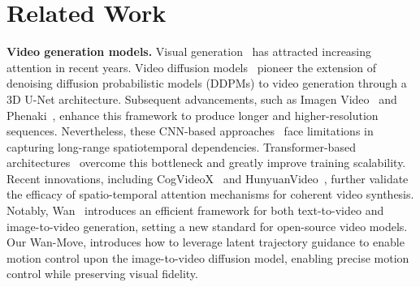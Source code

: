 \documentclass{article}
\newcommand{\method}{Wan-Move}
\begin{document}
\section{Related Work}
\noindent \textbf{Video generation models.}
Visual generation~\cite{rombach2022high,chen2025tts,li2024mini,chu2023diffcomplete,qiu2024freescale} has attracted increasing attention in recent years.
Video diffusion models~\cite{ho2022video} pioneer the extension of denoising diffusion probabilistic models (DDPMs) to video generation through a 3D U-Net architecture. Subsequent advancements, such as Imagen Video~\cite{ho2022imagenvideo} and Phenaki~\cite{villegas2022phenaki}, enhance this framework to produce longer and higher-resolution sequences. Nevertheless, these CNN-based approaches~\cite{chen2024videocrafter2,wang2023modelscope,bar2024lumiere} face limitations in capturing long-range spatiotemporal dependencies.
Transformer-based architectures~\cite{dit,hong2022cogvideo,chen2023pixartalpha,jin2024pyramidal,HaCohen2024LTXVideo,ma2024latte,lin2024open,openaisora2024,polyak2024moviegencastmedia,bao2024vidu,minimax2024hailuo,opensora,genmo2024mochi,step_video,chen2025sana,yang2025longlive,li2025adaviewplanner} overcome this bottleneck and greatly improve training scalability.
Recent innovations, including CogVideoX~\cite{cogvideox} and HunyuanVideo~\cite{kong2024hunyuanvideo}, further validate the efficacy of spatio-temporal attention mechanisms for coherent video synthesis. Notably, Wan~\cite{wan} introduces an efficient framework for both text-to-video and image-to-video generation, setting a new standard for open-source video models.
Our \method, introduces how to leverage latent trajectory guidance to enable motion control upon the image-to-video diffusion model, enabling precise motion control while preserving visual fidelity.
\end{document}
